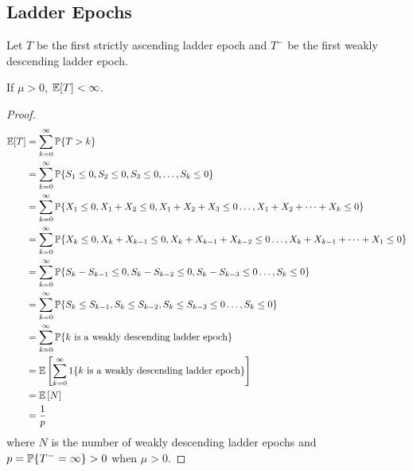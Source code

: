 \documentclass[all-lectures.tex]{subfiles}
\begin{document}

\setcounter{section}{2}
\setcounter{subsection}{1}
\section*{}
\subsection{Ladder Epochs}
Let $T$ be the first strictly ascending ladder epoch and $T^-$ be the first  weakly descending ladder epoch.
\begin{lem}
If $\mu > 0$, $\E[T] < \infty$. 
\begin{proof}
\begin{align*}
\E[T] &= \sum_{k=0}^\infty \P\{T > k\} \\
&= \sum_{k=0}^\infty \P\{S_1\leq 0,S_2 \leq 0,S_3 \leq 0,\dots,S_k \leq 0\} \\
&= \sum_{k=0}^\infty \P\{X_1 \leq 0,X_1+X_2 \leq 0,X_1+X_2+X_3 \leq 0\dots,X_1+X_2+\dots+X_k \leq 0\} \\
&= \sum_{k=0}^\infty \P\{X_k \leq 0,X_{k}+X_{k-1} \leq 0,X_k+X_{k-1}+X_{k-2} \leq 0\dots,X_k+X_{k-1}+\dots+X_1 \leq 0\} \\
&= \sum_{k=0}^\infty \P\{S_k - S_{k-1} \leq 0,S_k - S_{k-2} \leq 0,S_k - S_{k-3} \leq 0\dots,S_k \leq 0\} \\
&= \sum_{k=0}^\infty \P\{S_k \leq S_{k-1},S_k \leq S_{k-2} ,S_k \leq S_{k-3} \leq 0\dots,S_k \leq 0\} \\
&= \sum_{k=0}^\infty \P\{\text{$k$ is a weakly descending ladder epoch}\} \\
&= \E \left[ \sum_{k=0}^\infty 1\{\text{$k$ is a weakly descending ladder epoch}\} \right]\\
&= \E \left[ N \right]\\
&= \frac{1}{p}
\end{align*}
where $N$ is the number of weakly descending ladder epochs and $p = \P\{T^- = \infty\} > 0$ when $\mu > 0$.
\end{proof}
\end{lem}
\end{document}

